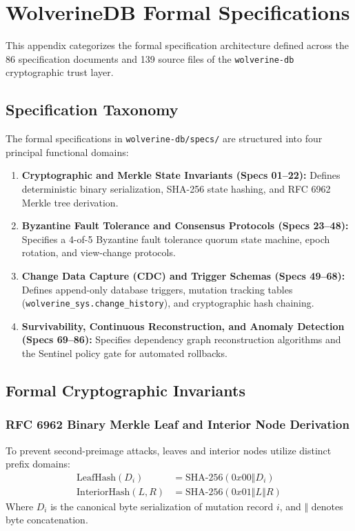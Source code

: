 \chapter{WolverineDB Formal Specifications}
\label{app:wolverine-db-specifications}

This appendix categorizes the formal specification architecture defined across the 86 specification documents and 139 source files of the \texttt{wolverine-db} cryptographic trust layer.

\section{Specification Taxonomy}
The formal specifications in \texttt{wolverine-db/specs/} are structured into four principal functional domains:

\begin{enumerate}
    \item \textbf{Cryptographic and Merkle State Invariants (Specs 01--22):} Defines deterministic binary serialization, SHA-256 state hashing, and RFC 6962 Merkle tree derivation.
    \item \textbf{Byzantine Fault Tolerance and Consensus Protocols (Specs 23--48):} Specifies a 4-of-5 Byzantine fault tolerance quorum state machine, epoch rotation, and view-change protocols.
    \item \textbf{Change Data Capture (CDC) and Trigger Schemas (Specs 49--68):} Defines append-only database triggers, mutation tracking tables (\texttt{wolverine\_sys.change\_history}), and cryptographic hash chaining.
    \item \textbf{Survivability, Continuous Reconstruction, and Anomaly Detection (Specs 69--86):} Specifies dependency graph reconstruction algorithms and the Sentinel policy gate for automated rollbacks.
\end{enumerate}

\section{Formal Cryptographic Invariants}

\subsection{RFC 6962 Binary Merkle Leaf and Interior Node Derivation}
To prevent second-preimage attacks, leaves and interior nodes utilize distinct prefix domains:
\begin{align}
\label{eq:merkle-leaf}
\text{LeafHash}(D_i) &= \text{SHA-256}(0x00 \mathbin{\Vert} D_i) \\
\label{eq:merkle-interior}
\text{InteriorHash}(L, R) &= \text{SHA-256}(0x01 \mathbin{\Vert} L \mathbin{\Vert} R)
\end{align}
Where $D_i$ is the canonical byte serialization of mutation record $i$, and $\mathbin{\Vert}$ denotes byte concatenation.

